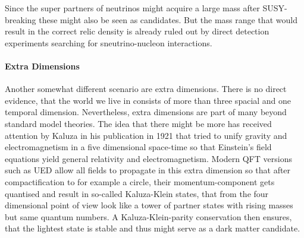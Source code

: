 Since the super partners of neutrinos might acquire a large mass after SUSY-breaking these might also be seen as candidates. But the mass range that would result in the correct relic density is already ruled out by direct detection experiments searching for sneutrino-nucleon interactions.

\paragraph{Extra Dimensions}
Another somewhat different scenario are extra dimensions. There is no direct evidence, that the world we live in consists of more than three spacial and one temporal dimension. Nevertheless, extra dimensions are part of many beyond standard model theories. The idea that there might be more has received attention by Kaluza in his publication in 1921 that tried to unify gravity and electromagnetism in a five dimensional space-time so that Einstein's field equations yield general relativity and electromagnetism.
Modern QFT versions such as UED allow all fields to propagate in this extra dimension so that after compactification to for example a circle, their momentum-component gets quantised and result in so-called Kaluza-Klein states, that from the four dimensional point of view look like a tower of partner states with rising masses but same quantum numbers. A Kaluza-Klein-parity conservation then ensures, that the lightest state is stable and thus might serve as a dark matter candidate.